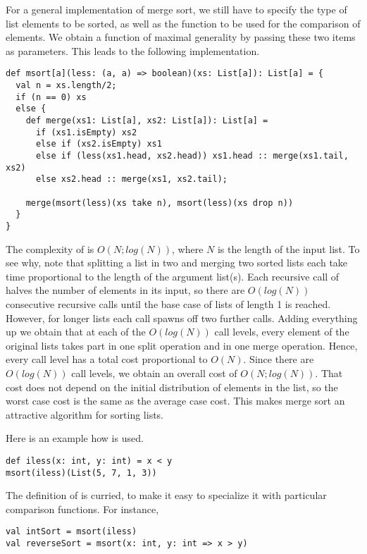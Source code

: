 \documentclass[11pt]{book}
\begin{document}
For a general implementation of merge sort, we still have to specify
the type of list elements to be sorted, as well as the function to be
used for the comparison of elements. We obtain a function of maximal
generality by passing these two items as parameters. This leads to the
following implementation.
\begin{verbatim}
def msort[a](less: (a, a) => boolean)(xs: List[a]): List[a] = {
  val n = xs.length/2;
  if (n == 0) xs
  else {
    def merge(xs1: List[a], xs2: List[a]): List[a] = 
      if (xs1.isEmpty) xs2
      else if (xs2.isEmpty) xs1
      else if (less(xs1.head, xs2.head)) xs1.head :: merge(xs1.tail, xs2)
      else xs2.head :: merge(xs1, xs2.tail);

    merge(msort(less)(xs take n), msort(less)(xs drop n))
  }
}
\end{verbatim}
The complexity of \verb@msort@ is $O(N;log(N))$, where $N$ is the
length of the input list. To see why, note that splitting a list in
two and merging two sorted lists each take time proportional to the
length of the argument list(s). Each recursive call of \verb@msort@
halves the number of elements in its input, so there are $O(log(N))$
consecutive recursive calls until the base case of lists of length 1
is reached.  However, for longer lists each call spawns off two
further calls. Adding everything up we obtain that at each of the
$O(log(N))$ call levels, every element of the original lists takes
part in one split operation and in one merge operation. Hence, every
call level has a total cost proportional to $O(N)$. Since there are
$O(log(N))$ call levels, we obtain an overall cost of
$O(N;log(N))$. That cost does not depend on the initial distribution
of elements in the list, so the worst case cost is the same as the
average case cost. This makes merge sort an attractive algorithm for
sorting lists.

Here is an example how \verb@msort@ is used.
\begin{verbatim}
def iless(x: int, y: int) = x < y
msort(iless)(List(5, 7, 1, 3))
\end{verbatim}
The definition of \verb@msort@ is curried, to make it easy to specialize it with particular
comparison functions. For instance,
\begin{verbatim}
val intSort = msort(iless)
val reverseSort = msort(x: int, y: int => x > y)
\end{verbatim}


\end{document}
